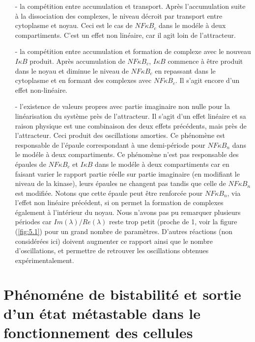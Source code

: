 \documentclass{article}
\def\magenta{\color{goldenrod}}
\begin{document}
\begin{itemize}
\item[-]la comp{\'e}tition entre accumulation et transport. Apr{\`e}s
l'accumulation suite {\`a} la dissociation des complexes, le niveau
d{\'e}croit par transport entre cytoplasme et noyau. Ceci est le cas
de $NF\kappa B_c$ dans le mod{\'e}le {\`a} deux compartiments. C'est un
effet non lin{\'e}aire, car il agit loin de l'attracteur. \item[-]la
comp{\'e}tition entre accumulation et formation de complexe avec le
nouveau $I\kappa B$ produit. Apr{\`e}s accumulation de $NF\kappa B_c$,
$I\kappa B$ commence {\`a} {\^e}tre produit dans le noyau et diminue le
niveau de $NF\kappa B_c$ en repassant dans le cytoplasme et en
formant des complexes avec $NF\kappa B_c$.  Il s'agit encore d'un
effet non-lin{\'e}aire. \item[-]l'existence de valeurs propres avec
partie imaginaire non nulle pour la lin{\'e}arisation du syst{\`e}me pr{\`e}s
de l'attracteur. Il s'agit d'un effet lin{\'e}aire et sa raison
physique est une combinaison des deux effets pr{\'e}c{\'e}dents, mais pr{\`e}s
de l'attracteur. Ceci produit des oscillations amorties. Ce
ph{\'e}nom{\`e}ne est responsable de l'{\'e}paule correspondant {\`a} une
demi-p{\'e}riode pour $NF\kappa B_n$ dans le mod{\'e}le {\`a} deux
compartiments. Ce ph{\'e}nom{\`e}ne n'est pas responsable des {\'e}paules de
$NF\kappa B_c$ et $I\kappa B$ dans le mod{\'e}le {\`a} deux compartiments
car en faisant varier le rapport partie r{\'e}elle sur partie
imaginaire (en modifiant le niveau de la kinase), leurs {\'e}paules ne
changent pas tandis que celle de $NF\kappa B_n$ est modifi{\'e}e.
Notons que cette {\'e}paule peut {\^e}tre renforc{\'e}e pour $NF\kappa B_n$,
via l'effet non lin{\'e}aire pr{\'e}c{\'e}dent, si on permet la formation de
complexes {\'e}galement {\`a} l'int{\'e}rieur du noyau. Nous n'avons pas pu
remarquer plusieurs p{\'e}riodes car $Im(\lambda)/Re(\lambda)$ reste
trop petit (proche de 1, voir la figure (\ref{fig:5.1}) pour un
grand nombre de param{\`e}tres. D'autres r{\'e}actions (non consid{\'e}r{\'e}es
ici) doivent augmenter ce rapport ainsi que le nombre
d'oscillations, et permettre de retrouver les oscillations
obtenues exp{\'e}rimentalement.
\end{itemize}



\section{\magenta \textsf{\Large
Ph{\'e}nom{\'e}ne de bistabilit{\'e} et sortie d'un {\'e}tat m{\'e}tastable dans le
fonctionnement des cellules}}
\end{document}
